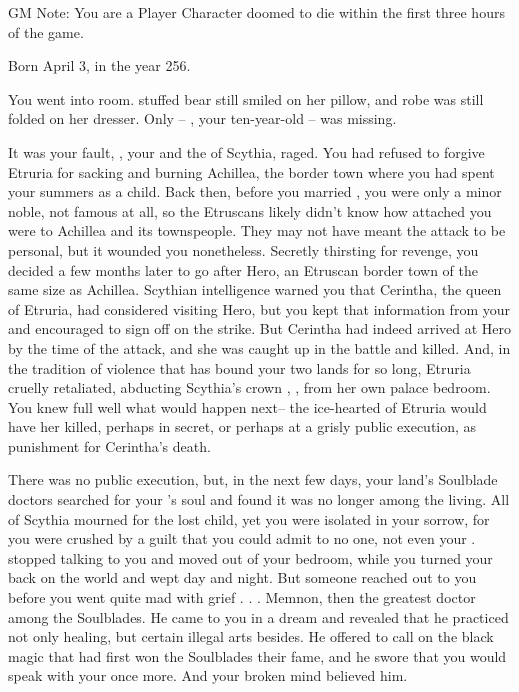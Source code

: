 \documentclass[char]{Kos}
\begin{document}
\name{\cQueenTwo{}}


GM Note: You are a Player Character doomed to die within the first three hours of the game.

Born April 3, in the year 256.

You went into \cFugitive{\their} room. \cFugitive{\Their} stuffed bear still smiled on her pillow, and \cFugitive{\their} robe was still folded on her dresser. Only \cFugitive{\they}-- \cFugitive{\realname}, your ten-year-old  \cFugitive{\offspring}-- was missing.

It was your fault, \cScythiaKing{\nickname}, your \cScythiaKing{\spouse} and the \cScythiaKing{\monarch} of Scythia, raged. You had refused to forgive Etruria for sacking and burning Achillea, the border town where you had spent your summers as a child. Back then, before you married \cScythiaKing{\nickname}, you were only a minor noble, not famous at all, so the Etruscans likely didn't know how attached you were to Achillea and its townspeople. They may not have meant the attack to be personal, but it wounded you nonetheless. Secretly thirsting for revenge, you decided a few months later to go after Hero, an Etruscan border town of the same size as Achillea. Scythian intelligence warned you that Cerintha, the queen of Etruria, had considered visiting Hero, but you kept that information from your \cScythiaKing{\spouse} and encouraged \cScythiaKing{\them} to sign off on the strike. But Cerintha had indeed arrived at Hero by the time of the attack, and she was caught up in the battle and killed. And, in the tradition of violence that has bound your two lands for so long, Etruria cruelly retaliated, abducting Scythia's crown \cFugitive{\prince}, \cFugitive{\realname}, from her own palace bedroom. You knew full well what would happen next-- the ice-hearted \cEtruriaKing{\Monarch} of Etruria would have her killed, perhaps in secret, or perhaps at a grisly public execution, as punishment for Cerintha's death.

There was no public execution, but, in the next few days, your land's Soulblade doctors searched for your \cFugitive{\offspring}'s soul and found it was no longer among the living. All of Scythia mourned for the lost child, yet you were isolated in your sorrow, for you were crushed by a guilt that you could admit to no one, not even your \cScythiaKing{\spouse}.  stopped talking to you and moved out of your bedroom, while you turned your back on the world and wept day and night. But someone reached out to you before you went quite mad with grief . . . Memnon, then the greatest doctor among the Soulblades. He came to you in a dream and revealed that he practiced not only healing, but certain illegal arts besides. He offered to call on the black magic that had first won the Soulblades their fame, and he swore that you would speak with your \cFugitive{\offspring} once more. And your broken mind believed him.
\end{document}
